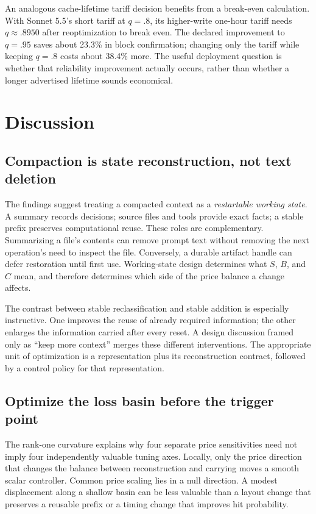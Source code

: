\documentclass[sigconf,screen,nonacm]{acmart}
\begin{document}
An analogous cache-lifetime tariff decision benefits from a break-even
calculation. With Sonnet 5.5's short tariff at $q=.8$, its higher-write
one-hour tariff needs $q\approx.8950$ after reoptimization to break even.
The declared improvement to $q=.95$ saves about 23.3\% in block confirmation;
changing only the tariff while keeping $q=.8$ costs about 38.4\% more.
The useful deployment question is whether that reliability improvement
actually occurs, rather than whether a longer advertised lifetime sounds
economical.

\section{Discussion}
\label{sec:discussion}

\subsection{Compaction is state reconstruction, not text deletion}

The findings suggest treating a compacted context as a \emph{restartable working
state}. A summary records decisions; source files and tools provide exact
facts; a stable prefix preserves computational reuse. These roles are
complementary. Summarizing a file's contents can remove prompt text without
removing the next operation's need to inspect the file. Conversely, a durable
artifact handle can defer restoration until first use. Working-state design
determines what $S$, $B$, and $C$ mean, and therefore determines which side of
the price balance a change affects.

The contrast between stable reclassification and stable addition is especially
instructive. One improves the reuse of already required information; the other
enlarges the information carried after every reset. A design discussion framed
only as ``keep more context'' merges these different interventions. The
appropriate unit of optimization is a representation plus its reconstruction
contract, followed by a control policy for that representation.

\subsection{Optimize the loss basin before the trigger point}

The rank-one curvature explains why four separate price sensitivities need
not imply four independently valuable tuning axes. Locally, only the price
direction that changes the balance between reconstruction and carrying
moves a smooth scalar controller. Common price scaling lies in a null
direction. A modest displacement along a shallow basin can be less valuable
than a layout change that preserves a reusable prefix or a timing change that
improves hit probability.
\end{document}
